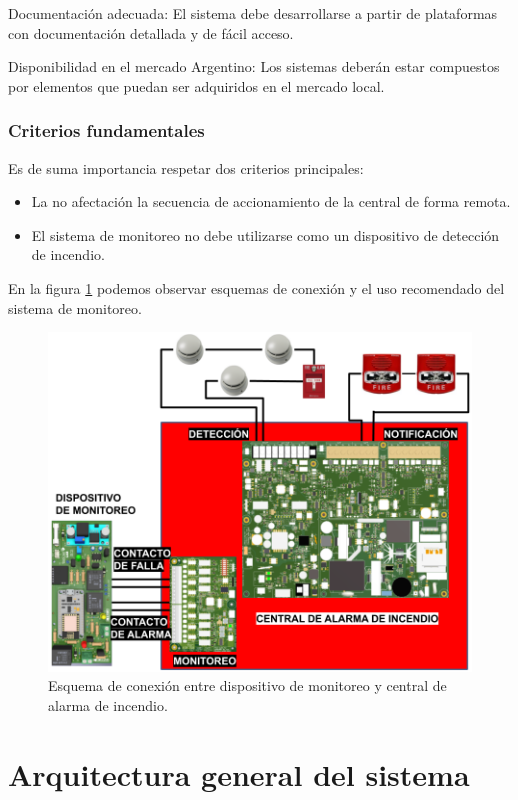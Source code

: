 Documentación adecuada:  El sistema debe desarrollarse a partir de plataformas con documentación detallada y de fácil acceso.

Disponibilidad en el mercado Argentino: Los sistemas deberán estar compuestos por elementos que puedan ser adquiridos en el mercado local.

\subsubsection{Criterios fundamentales}

Es de suma importancia respetar dos criterios principales:
\begin{itemize}
\item La no afectación la secuencia de accionamiento de la central de forma remota. 
\item El sistema de monitoreo no debe utilizarse como un dispositivo de detección de incendio.
\end{itemize}

En la figura \ref{fig:figura_b3} podemos observar esquemas de conexión y el uso recomendado del sistema de monitoreo.

\begin{figure}[]
	\centering
	\includegraphics[scale=.25]{./Figures/Capitulo3/Fig_B3.png}
	\caption{Esquema de conexión entre dispositivo de monitoreo y central de alarma de incendio.}
	\label{fig:figura_b3}
\end{figure}

\section{Arquitectura general del sistema}

